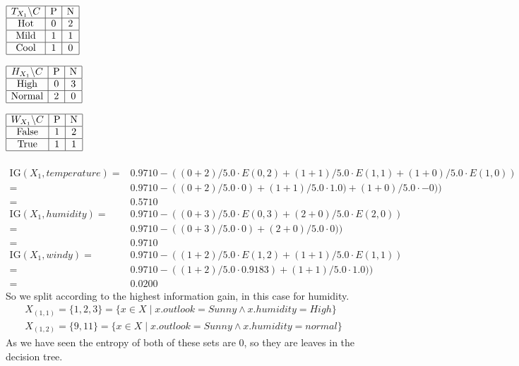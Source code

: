 \documentclass{article}
\theoremstyle{remark}
\begin{document}
	\begin{multicols}{3}
		$\begin{array}{|c|c|c|} \hline
		T_{X_1}\backslash C & \text{P} & \text{N}\\ \hline
		\text{Hot} & 0 & 2\\ \hline
		\text{Mild} & 1 & 1\\\hline
		\text{Cool} & 1 & 0\\\hline
		\end{array}$
		\columnbreak
		
		$\begin{array}{|c|c|c|}\hline
		H_{X_1}\backslash C & \text{P} & \text{N}\\\hline
		\text{High} & 0 & 3\\\hline
		\text{Normal} & 2 & 0\\\hline
		\end{array}$
		\columnbreak
		
		$\begin{array}{|c|c|c|}\hline
		W_{X_1}\backslash C & \text{P} & \text{N}\\\hline
		\text{False} & 1 & 2\\\hline
		\text{True} & 1 & 1 \\\hline
		\end{array}$
	\end{multicols}
	
	\begin{align*}
	\\\text{IG}(X_1,temperature)=& 0.9710-((0+2)/5.0 \cdot E(0,2)+(1+1)/5.0 \cdot E(1,1)+(1+0)/5.0 \cdot E(1,0))
	\\=&0.9710-((0+2)/5.0 \cdot 0)+(1+1)/5.0 \cdot 1.0)+(1+0)/5.0 \cdot -0))
	\\=& 0.5710
	\\\text{IG}(X_1,humidity)=& 0.9710-((0+3)/5.0 \cdot E(0,3)+(2+0)/5.0 \cdot E(2,0))
	\\=& 0.9710-((0+3)/5.0 \cdot 0)+(2+0)/5.0 \cdot 0))
	\\=& 0.9710
	\\\text{IG}(X_1,windy)=& 0.9710-((1+2)/5.0 \cdot E(1,2)+(1+1)/5.0 \cdot E(1,1))
	\\=& 0.9710-((1+2)/5.0 \cdot 0.9183)+(1+1)/5.0 \cdot 1.0))
	\\=& 0.0200
	\end{align*}      
	So we split according to the highest information gain, in this case for humidity.\\
	\begin{align*}
	X_{(1,1)}=\{1,2,3\}=\{x\in X \mid x.outlook = Sunny \wedge x.humidity = High \}\\
	X_{(1,2)}= \{9,11\} = \{x\in X \mid x.outlook = Sunny \wedge x.humidity = normal \}
	\end{align*}
	As we have seen the entropy of both of these sets are 0, so they are leaves in the decision tree.
	
\end{document}
